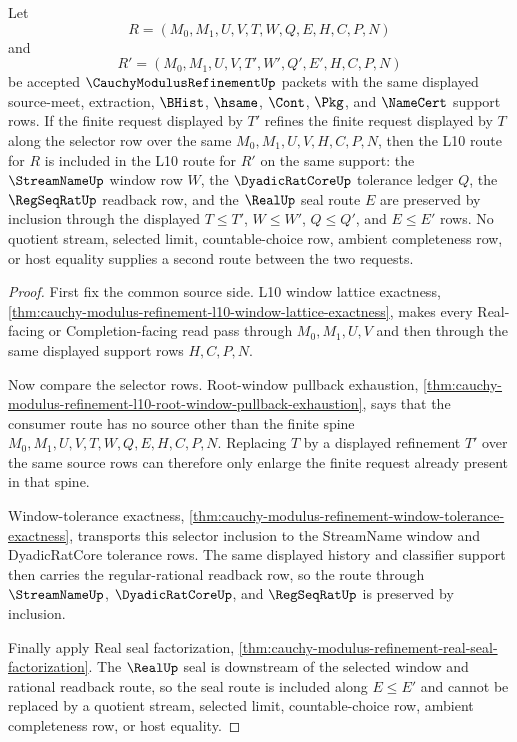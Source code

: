 \begin{theorem}
\label{thm:cauchy-modulus-refinement-l10-finite-request-route-monotonicity}
Let
$$
R=(M_0,M_1,U,V,T,W,Q,E,H,C,P,N)
$$
and
$$
R'=(M_0,M_1,U,V,T',W',Q',E',H,C,P,N)
$$
be accepted $\CauchyModulusRefinementUp$ packets with the same displayed source-meet, extraction, $\BHist$, $\hsame$, $\Cont$, $\Pkg$, and $\NameCert$ support rows. If the finite request displayed by $T'$ refines the finite request displayed by $T$ along the selector row over the same $M_0,M_1,U,V,H,C,P,N$, then the L10 route for $R$ is included in the L10 route for $R'$ on the same support: the $\StreamNameUp$ window row $W$, the $\DyadicRatCoreUp$ tolerance ledger $Q$, the $\RegSeqRatUp$ readback row, and the $\RealUp$ seal route $E$ are preserved by inclusion through the displayed $T \leq T'$, $W \leq W'$, $Q \leq Q'$, and $E \leq E'$ rows. No quotient stream, selected limit, countable-choice row, ambient completeness row, or host equality supplies a second route between the two requests.
\end{theorem}
\begin{proof}
First fix the common source side. L10 window lattice exactness, \autoref{thm:cauchy-modulus-refinement-l10-window-lattice-exactness}, makes every Real-facing or Completion-facing read pass through $M_0,M_1,U,V$ and then through the same displayed support rows $H,C,P,N$.

Now compare the selector rows. Root-window pullback exhaustion, \autoref{thm:cauchy-modulus-refinement-l10-root-window-pullback-exhaustion}, says that the consumer route has no source other than the finite spine $M_0,M_1,U,V,T,W,Q,E,H,C,P,N$. Replacing $T$ by a displayed refinement $T'$ over the same source rows can therefore only enlarge the finite request already present in that spine.

Window-tolerance exactness, \autoref{thm:cauchy-modulus-refinement-window-tolerance-exactness}, transports this selector inclusion to the StreamName window and DyadicRatCore tolerance rows. The same displayed history and classifier support then carries the regular-rational readback row, so the route through $\StreamNameUp$, $\DyadicRatCoreUp$, and $\RegSeqRatUp$ is preserved by inclusion.

Finally apply Real seal factorization, \autoref{thm:cauchy-modulus-refinement-real-seal-factorization}. The $\RealUp$ seal is downstream of the selected window and rational readback route, so the seal route is included along $E \leq E'$ and cannot be replaced by a quotient stream, selected limit, countable-choice row, ambient completeness row, or host equality.
\end{proof}

